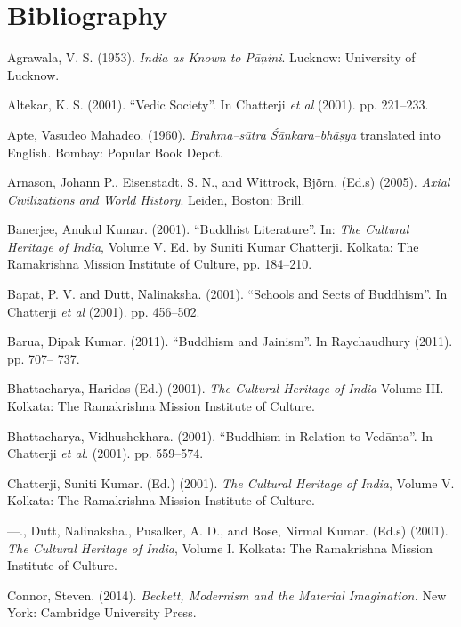 \section*{Bibliography}

\begin{thebibliography}{99}
\itemsep=1pt
 Agrawala, V. S. (1953). \textit{India as Known to Pāṇini}. Lucknow: University of Lucknow.

  Altekar, K. S. (2001). “Vedic Society”. In Chatterji \textit{et al} (2001). pp. 221–233.

  Apte, Vasudeo Mahadeo. (1960). \textit{Brahma–sūtra Śānkara–bhāṣya} translated into English. Bombay: Popular Book Depot.

  Arnason, Johann P., Eisenstadt, S. N., and Wittrock, Björn. (Ed.s) (2005). \textit{Axial Civilizations and World History}. Leiden, Boston: Brill.

  Banerjee, Anukul Kumar. (2001). “Buddhist Literature”. In: \textit{The Cultural Heritage of India}, Volume V. Ed. by Suniti Kumar Chatterji. Kolkata: The Ramakrishna Mission Institute of Culture, pp. 184–210.

  Bapat, P. V. and Dutt, Nalinaksha. (2001). “Schools and Sects of Buddhism”. In Chatterji \textit{et al }(2001). pp. 456–502.

  Barua, Dipak Kumar. (2011). “Buddhism and Jainism”. In Raychaudhury (2011). pp. 707– 737.

  Bhattacharya, Haridas (Ed.) (2001). \textit{The Cultural Heritage of India} Volume III. Kolkata: The Ramakrishna Mission Institute of Culture.

  Bhattacharya, Vidhushekhara. (2001). “Buddhism in Relation to Vedānta”. In Chatterji \textit{et al}. (2001). pp. 559–574.

  Chatterji, Suniti Kumar. (Ed.) (2001). \textit{The Cultural Heritage of India}, Volume V. Kolkata: The Ramakrishna Mission Institute of Culture.

  —., Dutt, Nalinaksha., Pusalker, A. D., and Bose, Nirmal Kumar. (Ed.s) (2001). \textit{The Cultural Heritage of India}, Volume I. Kolkata: The Ramakrishna Mission Institute of Culture.

  Connor, Steven. (2014). \textit{Beckett, Modernism and the Material Imagination. }New York: Cambridge University Press.


\end{thebibliography}
